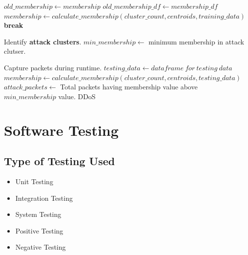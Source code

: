 \documentclass[12pt,a4paper,final]{report}
\begin{document}
\begin{algorithm}
\begin{algorithmic}[1]
\State $old\_membership \leftarrow membership$
\State $old\_membership\_df \leftarrow membership\_df$
\State $membership \leftarrow calculate\_membership(cluster\_count, centroids, training\_data)$
\State \textbf{break}
\EndIf
\EndWhile

\State Identify \textbf{attack clusters}.
\State $min\_membership \leftarrow$ minimum membership in attack clutser.

\State Capture packets during runtime.
\State $testing\_data \leftarrow dataframe\ for\ testing\ data$
\State $membership \leftarrow calculate\_membership(cluster\_count, centroids, testing\_data)$
\State $attack\_packets \leftarrow $ Total packets having membership value above $min\_membership$ value.
\State \Return DDoS
\EndIf
\EndWhile
\EndFunction
\end{algorithmic}
\end{algorithm}

\begin{minipage}{\textwidth}
\end{minipage}

\newpage
{}
\chapter{Software Testing}
\thispagestyle{empty}
\newpage


\section{Type of Testing Used}
\begin{itemize}
\item Unit Testing
\item Integration Testing
\item System Testing
\item Positive Testing
\item Negative Testing
\end{itemize}
\end{document}

